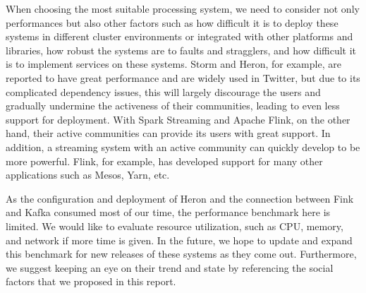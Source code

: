 \documentclass[pdftex,twocolumn,10pt,letterpaper]{article}
\begin{document}
When choosing the most suitable processing system, we need to consider not only performances but also other factors such as how difficult it is to deploy these systems in different cluster environments or integrated with other platforms and libraries, how robust the systems are to faults and stragglers, and how difficult it is to implement services on these systems. Storm and Heron, for example, are reported to have great performance and are widely used in Twitter, but due to its complicated dependency issues, this will largely discourage the users and gradually undermine the activeness of their communities, leading to even less support for deployment. With Spark Streaming and Apache Flink, on the other hand, their active communities can provide its users with great support. In addition, a streaming system with an active community can quickly develop to be more powerful. Flink, for example, has developed support for many other applications such as Mesos, Yarn, etc. 

As the configuration and deployment of Heron and the connection between Fink and Kafka consumed most of our time, the performance benchmark here is limited. We would like to evaluate resource utilization, such as CPU, memory, and network if more time is given. In the future, we hope to update and expand this benchmark for new releases of these systems as they come out. Furthermore, we suggest keeping an eye on their trend and state by referencing the social factors that we proposed in this report.    


{
    
    
}
\end{document}
